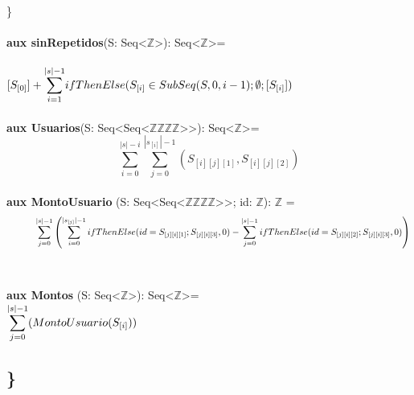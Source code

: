 \documentclass{article}
\begin{document}
    \}\\\\

    \textbf{aux sinRepetidos}(S: Seq\textless$\mathds{Z}$\textgreater): Seq\textless$\mathds{Z}$\textgreater =\\\\
        \indent\indent $[S_{[0]}] + \mathlarger\sum\limits_{i=1}^{|s|-1} ifThenElse(S_{[i]} \in SubSeq(S, 0, i-1); \emptyset; [S_{[i]}])$ \\\\

    \textbf{aux Usuarios}(S: Seq\textless Seq\textless$\mathds{Z}$\texttimes$\mathds{Z}$\texttimes$\mathds{Z}$\texttimes$\mathds{Z}$\textgreater\textgreater): Seq\textless$\mathds{Z}$\textgreater=
    \[
    \sum\limits_{i=0}^{|s|-i} \sum\limits_{j=0}^{|s_{[i]}|-1} \left(S_{[i][j][1]}, S_{[i][j][2]}\right)
    \]\\

    \textbf{aux MontoUsuario} (S: Seq\textless Seq\textless $\mathds{Z}$\texttimes$\mathds{Z}$\texttimes$\mathds{Z}$\texttimes$\mathds{Z}$\textgreater\textgreater; id: $\mathds{Z}$): $\mathds{Z}$ =\\
        \[
        \indent\indent \sum\limits_{j=0}^{|s|-1} \left( \sum\limits_{i=0}^{|s_{[j]}|-1} 
                        ifThenElse(id = S_{[j][i][1]}; S_{[j][i][3]}, 0) 
                        - \sum\limits_{j=0}^{|s|-1} ifThenElse(id = S_{[j][i][2]}; S_{[j][i][3]}, 0) \right)
        \]\\\\

    \textbf{aux Montos} (S: Seq\textless$\mathds{Z}$\textgreater): Seq\textless$\mathds{Z}$\textgreater = \\

        \indent\indent $\mathlarger\sum\limits_{j=0}^{|s|-1} (MontoUsuario(S_{[i]}))$


\subsection*{\}}
\end{document}
